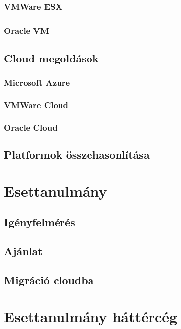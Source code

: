 \documentclass[12pt,oneside,justify]{book}
\begin{document}

\subsection{VMWare ESX \textsuperscript{\textregistered}}


\subsection{Oracle\textsuperscript{\textregistered} VM}


\section{Cloud megoldások}
\subsection{Microsoft Azure}


\subsection{VMWare Cloud}


\subsection{Oracle Cloud}


\section{Platformok összehasonlítása}


\chapter{Esettanulmány}
\section{Igényfelmérés}


\section{Ajánlat}


\section{Migráció cloudba}


\chapter{Esettanulmány háttércég}
\end{document}
